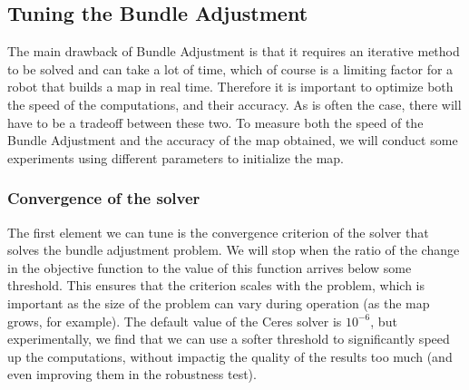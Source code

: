 \subsection{Tuning the Bundle Adjustment}
The main drawback of Bundle Adjustment is that it requires an iterative method to be solved and can take a lot of time, which of course is a limiting factor for a robot that builds a map in real time. Therefore it is important to optimize both the speed of the computations, and their accuracy. As is often the case, there will have to be a tradeoff between these two. To measure both the speed of the Bundle Adjustment and the accuracy of the map obtained, we will conduct some experiments using different parameters to initialize the map.

\subsubsection{Convergence of the solver}
The first element we can tune is the convergence criterion of the solver that solves the bundle adjustment problem. We will stop when the ratio of the change in the objective function to the value of this function arrives below some threshold. This ensures that the criterion scales with the problem, which is important as the size of the problem can vary during operation (as the map grows, for example). The default value of the Ceres solver is $10^{-6}$, but experimentally, we find that we can use a softer threshold to significantly speed up the computations, without impactig the quality of the results too much (and even improving them in the robustness test).

